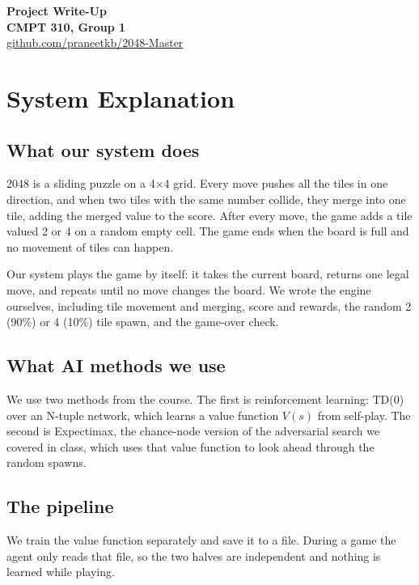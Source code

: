 \documentclass[11pt]{article}
\begin{document}
\begin{center}
{\LARGE\bfseries\color{ink} Project Write-Up}\\[0.15em]
{\normalsize\bfseries\color{ink} CMPT 310, Group 1}\\[0.15em]
\href{https://github.com/praneetkb/2048-Master}{github.com/praneetkb/2048-Master}
\end{center}
\vspace{1em}

\section{System Explanation}

\subsection{What our system does}

2048 is a sliding puzzle on a 4×4 grid. Every move pushes all the tiles in one direction, and when two tiles with the same number collide, they merge into one tile, adding the merged value to the score. After every move, the game adds a tile valued 2 or 4 on a random empty cell. The game ends when the board is full and no movement of tiles can happen.

Our system plays the game by itself: it takes the current board, returns one legal move, and repeats until no move changes the board. We wrote the engine ourselves, including tile movement and merging, score and rewards, the random 2 (90\%) or 4 (10\%) tile spawn, and the game-over check.

\subsection{What AI methods we use}

We use two methods from the course. The first is reinforcement learning: TD(0) over an N-tuple network, which learns a value function $V(s)$ from self-play. The second is Expectimax, the chance-node version of the adversarial search we covered in class, which uses that value function to look ahead through the random spawns.

\subsection{The pipeline}

We train the value function separately and save it to a file. During a game the agent only reads that file, so the two halves are independent and nothing is learned while playing.
\end{document}
